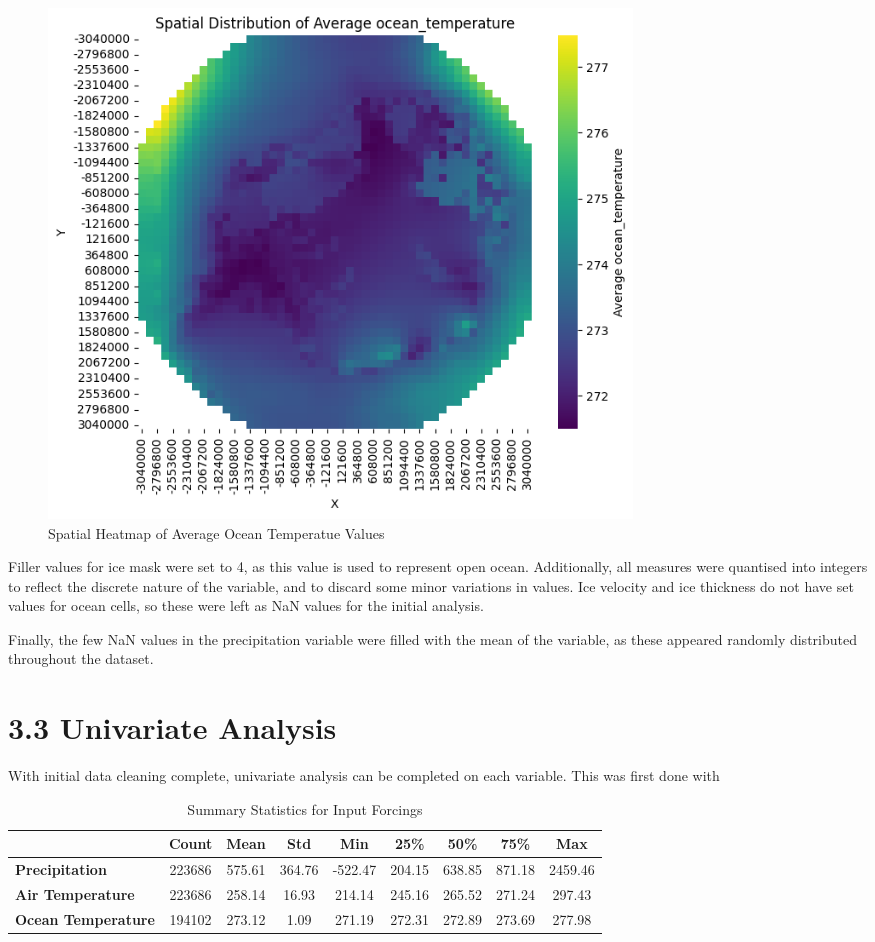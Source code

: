 \documentclass[11pt, a4paper, twoside, openright]{report}
\begin{document}
\begin{figure}[ht]
  \centering
  \includegraphics[width=0.75\textwidth]{images/ocean_temperature_spatial_heatmap.png}
  \caption{Spatial Heatmap of Average Ocean Temperatue Values}
  \label{fig:example-image}
\end{figure}

Filler values for ice mask were set to 4, as this value is used to represent open ocean.
Additionally, all measures were quantised into integers to reflect the discrete nature of
the variable, and to discard some minor variations in values. Ice velocity and ice thickness
do not have set values for ocean cells, so these were left as NaN values for the initial analysis.

Finally, the few NaN values in the precipitation variable were filled with the mean of the variable, as these
appeared randomly distributed throughout the dataset.

\section*{3.3 Univariate Analysis}
With initial data cleaning complete, univariate analysis can be completed on each variable. This was first done with 

\begin{table}
  \centering
  \caption{Summary Statistics for Input Forcings}
  \begin{tabular}{lcccccccc}
      \toprule
      & \textbf{Count} & \textbf{Mean} & \textbf{Std} & \textbf{Min} & \textbf{25\%} & \textbf{50\%} & \textbf{75\%} & \textbf{Max} \\
      \midrule
      \textbf{Precipitation} & 223686 & 575.61 & 364.76 & -522.47 & 204.15 & 638.85 & 871.18 & 2459.46 \\
      \textbf{Air Temperature} & 223686 & 258.14 & 16.93 & 214.14 & 245.16 & 265.52 & 271.24 & 297.43 \\
      \textbf{Ocean Temperature} & 194102 & 273.12 & 1.09 & 271.19 & 272.31 & 272.89 & 273.69 & 277.98 \\
      \bottomrule
  \end{tabular}
\end{table}
\end{document}

